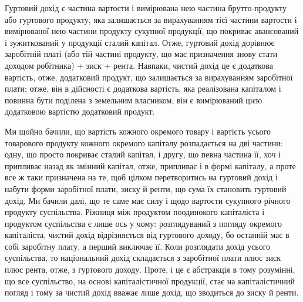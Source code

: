 
Гуртовий дохід є частина вартости і вимірювана нею частина брутто-продукту
або гуртового продукту, яка залишається за вирахуванням тієї частини
вартости і вимірюваної нею частини продукту сукупної продукції, що покриває
авансований і зужиткований у продукції сталий капітал. Отже, гуртовий дохід
дорівнює заробітній платі (або тій частині продукту, що має призначення знову
стати доходом робітника) + зиск + рента. Навпаки, чистий дохід це є додаткова
вартість, отже, додатковий продукт, що залишається за вирахуванням заробітної
плати; отже, він в дійсності є додаткова вартість, яка реалізована капіталом і
повинна бути поділена з земельним власником, він є вимірюваний цією додатковою
вартістю додатковий продукт.

Ми щойно бачили, що вартість кожного окремого товару і вартість усього
товарового продукту кожного окремого капіталу розпадається на дві частини:
одну, що просто покриває сталий капітал, і другу, що певна частина її, хоч і
припливає назад як змінний капітал, отже, припливає і в формі капіталу,
а проте все ж таки призначена на те, щоб цілком перетворитись на гуртовий
дохід і набути форми заробітної плати, зиску й ренти, що сума їх становить
гуртовий дохід. Ми бачили далі, що те саме має силу і щодо вартости сукупного
річного продукту суспільства. Ріжниця між продуктом поодинокого капіталіста
і продуктом суспільства є лише ось у чому: розглядуваний з погляду
окремого капіталіста, чистий дохід відрізняється від гуртового доходу, бо останній
має в собі заробітну плату, а перший виключає її. Коли розглядати дохід
усього суспільства, то національний дохід складається з заробітної плати плюс
зиск плюс рента, отже, з гуртового доходу. Проте, і це є абстракція в тому
розумінні, що все суспільство, на основі капіталістичної продукції, стає на капіталістичний
погляд і тому за чистий дохід вважає лише дохід, що зводиться
до зиску й ренти.

